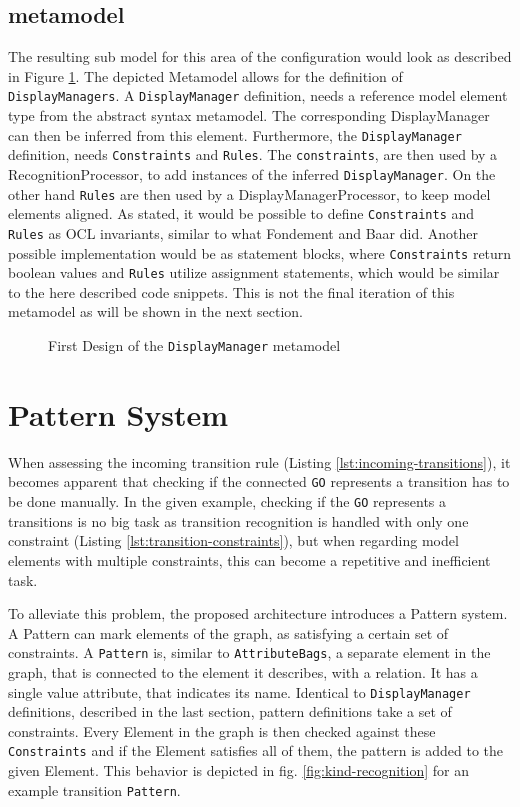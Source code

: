 \subsection{metamodel}
The resulting sub model for this area of the configuration would look as described in Figure \ref{fig:initial-syntax-model}. The depicted Metamodel allows for the definition of \texttt{DisplayManagers}. A \texttt{DisplayManager} definition, needs a reference model element type from the abstract syntax metamodel. The corresponding DisplayManager can then be inferred from this element. Furthermore, the \texttt{DisplayManager} definition, needs \texttt{Constraints} and \texttt{Rules}. The \texttt{constraints}, are then used by a RecognitionProcessor, to add instances of the inferred \texttt{DisplayManager}. On the other hand \texttt{Rules} are then used by a DisplayManagerProcessor, to keep model elements aligned. As stated, it would be possible to define \texttt{Constraints} and \texttt{Rules} as OCL invariants, similar to what Fondement and Baar did. Another possible implementation would be as statement blocks, where \texttt{Constraints} return boolean values and \texttt{Rules} utilize assignment statements, which would be similar to the here described code snippets. This is not the final iteration of this metamodel as will be shown in the next section.

\begin{figure}
  \centering
  
  \caption{First Design of the \texttt{DisplayManager} metamodel}
  \label{fig:initial-syntax-model}
\end{figure}


\section{Pattern System}
When assessing the incoming transition rule (Listing \ref{lst:incoming-transitions}), it becomes apparent that checking if the connected \texttt{GO} represents a transition has to be done manually. In the given example, checking if the \texttt{GO} represents a transitions is no big task as transition recognition is handled with only one constraint (Listing \ref{lst:transition-constraints}), but when regarding model elements with multiple constraints, this can become a repetitive and inefficient task.

To alleviate this problem, the proposed architecture introduces a Pattern system. A Pattern can mark elements of the graph, as satisfying a certain set of constraints. A \texttt{Pattern} is, similar to \texttt{AttributeBags}, a separate element in the graph, that is connected to the element it describes, with a relation. It has a single value attribute, that indicates its name. Identical to \texttt{DisplayManager} definitions, described in the last section, pattern definitions take a set of constraints. Every Element in the graph is then checked against these \texttt{Constraints} and if the Element satisfies all of them, the pattern is added to the given Element. This behavior is depicted in fig. \ref{fig:kind-recognition} for an example transition \texttt{Pattern}.


